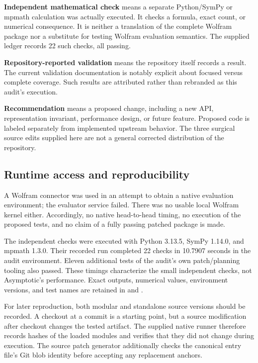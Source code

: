 \documentclass[11pt,a4paper]{article}
\newcommand{\code}[1]{\texttt{\detokenize{#1}}}
\theoremstyle{definition}
\begin{document}
\textbf{Independent mathematical check} means a separate Python/SymPy or mpmath calculation was actually executed. It checks a formula, exact count, or numerical consequence. It is neither a translation of the complete Wolfram package nor a substitute for testing Wolfram evaluation semantics. The supplied ledger records 22 such checks, all passing.

\textbf{Repository-reported validation} means the repository itself records a result. The current validation documentation is notably explicit about focused versus complete coverage. Such results are attributed rather than rebranded as this audit's execution.\cite{validation}

\textbf{Recommendation} means a proposed change, including a new API, representation invariant, performance design, or future feature. Proposed code is labeled separately from implemented upstream behavior. The three surgical source edits supplied here are not a general corrected distribution of the repository.

\subsection{Runtime access and reproducibility}

A Wolfram connector was used in an attempt to obtain a native evaluation environment; the evaluator service failed. There was no usable local Wolfram kernel either. Accordingly, no native head-to-head timing, no execution of the proposed \code{.wlt} tests, and no claim of a fully passing patched package is made.

The independent checks were executed with Python 3.13.5, SymPy 1.14.0, and mpmath 1.3.0. Their recorded run completed 22 checks in 10.7907 seconds in the audit environment. Eleven additional tests of the audit's own patch/planning tooling also passed. These timings characterize the small independent checks, not Asymptotic's performance. Exact outputs, numerical values, environment versions, and test names are retained in \code{results/oracles.json} and \code{results/tool-tests.txt}.

For later reproduction, both modular and standalone source versions should be recorded. A checkout at a commit is a starting point, but a source modification after checkout changes the tested artifact. The supplied native runner therefore records hashes of the loaded modules and verifies that they did not change during execution. The source patch generator additionally checks the canonical entry file's Git blob identity before accepting any replacement anchors.
\end{document}
